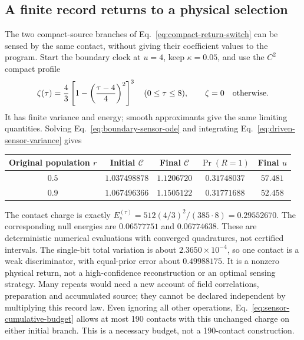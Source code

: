 \subsection{A finite record returns to a physical selection}
\label{sec:sensor-selection-return}

The two compact-source branches of Eq.~\eqref{eq:compact-return-switch} can
be sensed by the same contact, without giving their coefficient values to the
program. Start the boundary clock at $u=4$, keep $\kappa=0.05$, and use the
$C^2$ compact profile
\begin{equation}\label{eq:finite-sensor-profile}
 \zeta(\tau)=\frac43\left[1-\left(\frac{\tau-4}{4}\right)^2\right]^3
 \quad (0\le\tau\le8),\qquad \zeta=0\quad\hbox{otherwise}.
\end{equation}
It has finite variance and energy; smooth approximants give the same limiting
quantities. Solving Eq.~\eqref{eq:boundary-sensor-ode} and integrating
Eq.~\eqref{eq:driven-sensor-variance} gives
\begin{center}
\begin{tabular}{@{}ccccc@{}}
\toprule
Original population $r$ & Initial $\mathcal C$ & Final $\mathcal C$
 & $\Pr(R=1)$ & Final $u$\\
\midrule
$0.5$ & $1.037498878$ & $1.1206720$ & $0.31748037$ & $57.481$\\
$0.9$ & $1.067496366$ & $1.1505122$ & $0.31771688$ & $52.458$\\
\bottomrule
\end{tabular}
\end{center}
The contact charge is exactly
$E_s^{(\tau)}=512(4/3)^2/(385\cdot8)=0.29552670$.
The corresponding null energies are $0.06577751$ and $0.06774638$.
These are deterministic numerical evaluations with converged quadratures,
not certified intervals. The single-bit total variation is about
$2.3650\times10^{-4}$, so one contact is a weak discriminator, with
equal-prior error about $0.49988175$. It is a nonzero physical return, not a
high-confidence reconstruction or an optimal sensing strategy. Many repeats
would need a new account of field correlations, preparation and accumulated
source; they cannot be declared independent by multiplying this record law.
Even ignoring all other operations, Eq.~\eqref{eq:sensor-cumulative-budget}
allows at most 190 contacts with this unchanged charge on either initial
branch. This is a necessary budget, not a 190-contact construction.

